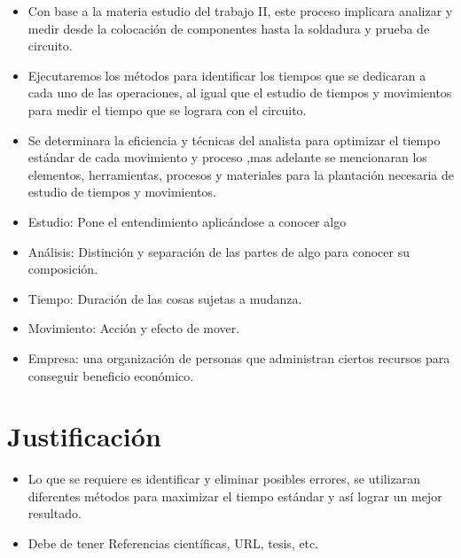     \begin{itemize}
        \item Con base a la materia estudio del trabajo II,   este proceso implicara analizar y medir desde la colocación de componentes hasta la soldadura y prueba de circuito.  
        \item Ejecutaremos los  métodos para  identificar los tiempos que se dedicaran a cada uno de las operaciones, al igual que el estudio de tiempos y movimientos para medir el tiempo que se lograra con el circuito. 
        \item Se determinara la 
     eficiencia y técnicas del analista para optimizar el tiempo estándar de cada movimiento y proceso ,mas adelante se mencionaran los elementos, herramientas,  procesos y materiales para la plantación necesaria de estudio de tiempos y movimientos.
     
    \item Estudio: Pone el entendimiento aplicándose a conocer algo
    \item Análisis: Distinción y separación de las partes de algo para conocer su composición.
    \item Tiempo: Duración de las cosas sujetas a mudanza.
    \item Movimiento: Acción y efecto de mover.
    \item Empresa: una organización de personas que administran ciertos recursos para conseguir beneficio económico. 
    \cite{Empresa-2024}
    \end{itemize}
    \section{Justificación}
    
    \begin{itemize}
        \item Lo que se requiere es identificar y eliminar posibles errores, se utilizaran diferentes  métodos para maximizar el tiempo estándar y así lograr un mejor resultado.  
        \item Debe de tener Referencias científicas, URL, tesis, etc.
    \end{itemize}

